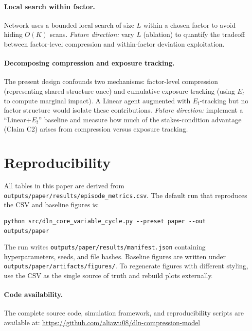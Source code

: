 \documentclass[11pt]{article}
\begin{document}
\paragraph{Local search within factor.}
Network uses a bounded local search of size $L$ within a chosen factor to avoid hiding $O(K)$ scans.
\emph{Future direction:} vary $L$ (ablation) to quantify the tradeoff between factor-level compression and within-factor deviation exploitation.

\paragraph{Decomposing compression and exposure tracking.}
The present design confounds two mechanisms: factor-level compression (representing shared structure once) and cumulative exposure tracking (using $E_t$ to compute marginal impact). A Linear agent augmented with $E_t$-tracking but no factor structure would isolate these contributions.
\emph{Future direction:} implement a ``Linear+$E_t$'' baseline and measure how much of the stakes-condition advantage (Claim C2) arises from compression versus exposure tracking.


\section{Reproducibility}\label{sec:repro}

All tables in this paper are derived from \texttt{outputs/paper/results/episode\_metrics.csv}. The default run that reproduces the CSV and baseline figures is:

\begin{verbatim}
python src/dln_core_variable_cycle.py --preset paper --out outputs/paper
\end{verbatim}

The run writes \texttt{outputs/paper/results/manifest.json} containing hyperparameters, seeds, and file hashes. Baseline figures are written under \texttt{outputs/paper/artifacts/figures/}. To regenerate figures with different styling, use the CSV as the single source of truth and rebuild plots externally.

\paragraph{Code availability.}
The complete source code, simulation framework, and reproducibility scripts are available at:
\url{https://github.com/aliawu08/dln-compression-model}
\end{document}
